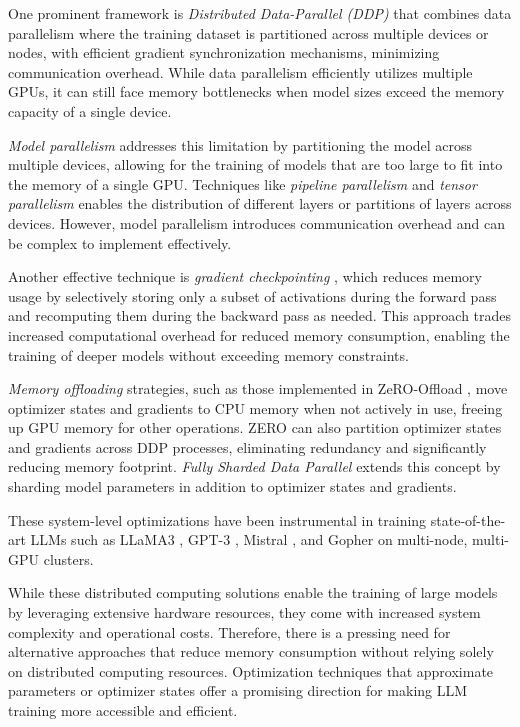 One prominent framework is \textit{Distributed Data-Parallel (DDP)} that combines data parallelism where the training dataset is partitioned across multiple devices or nodes, with efficient gradient synchronization mechanisms, minimizing communication overhead. While data parallelism efficiently utilizes multiple GPUs, it can still face memory bottlenecks when model sizes exceed the memory capacity of a single device.

\textit{Model parallelism} addresses this limitation by partitioning the model across multiple devices, allowing for the training of models that are too large to fit into the memory of a single GPU. Techniques like \textit{pipeline parallelism} \citep{huangGPipeEfficientTraining2019} and \textit{tensor parallelism} \citep{shoeybiMegatronLMTuningScaling2019} enables the distribution of different layers or partitions of layers across devices. However, model parallelism introduces communication overhead and can be complex to implement effectively.

Another effective technique is \textit{gradient checkpointing} \citep{chenTrainingDeepNets2016}, which reduces memory usage by selectively storing only a subset of activations during the forward pass and recomputing them during the backward pass as needed. This approach trades increased computational overhead for reduced memory consumption, enabling the training of deeper models without exceeding memory constraints.

\textit{Memory offloading} strategies, such as those implemented in ZeRO-Offload \citep{rajbhandariZeROMemoryOptimizations2020}, move optimizer states and gradients to CPU memory when not actively in use, freeing up GPU memory for other operations. ZERO can also partition optimizer states and gradients across DDP processes, eliminating redundancy and significantly reducing memory footprint. \textit{Fully Sharded Data Parallel} \citep{zhaoExtendingTorchElasticStateful2020} extends this concept by sharding model parameters in addition to optimizer states and gradients.

These system-level optimizations have been instrumental in training state-of-the-art LLMs such as LLaMA3 \citep{touvronLlamaOpenFoundation2023}, GPT-3 \citep{brownLanguageModelsAre2020}, Mistral \citep{jiangMistralEfficientComposable2023}, and Gopher \citep{raeScalingLanguageModels2021} on multi-node, multi-GPU clusters.

While these distributed computing solutions enable the training of large models by leveraging extensive hardware resources, they come with increased system complexity and operational costs. Therefore, there is a pressing need for alternative approaches that reduce memory consumption without relying solely on distributed computing resources. Optimization techniques that approximate parameters or optimizer states offer a promising direction for making LLM training more accessible and efficient.

